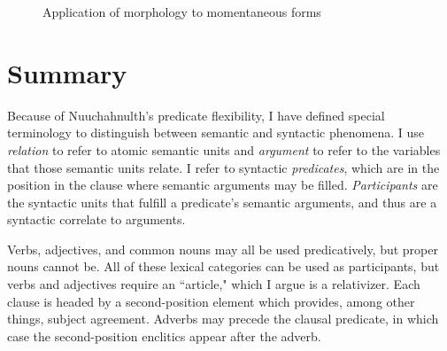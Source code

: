 \begin{figure}[H]
\begin{center}
\caption{Application of morphology to momentaneous forms}
\label{figure:momentaneousapplication}
\end{center}
\end{figure}

\section{Summary} \label{ch:clause:summary}

Because of Nuuchahnulth's predicate flexibility, I have defined special terminology to distinguish between semantic and syntactic phenomena. I use \textit{relation} to refer to atomic semantic units and \textit{argument} to refer to the variables that those semantic units relate. I refer to syntactic \textit{predicates}, which are in the position in the clause where semantic arguments may be filled. \textit{Participants} are the syntactic units that fulfill a predicate's semantic arguments, and thus are a syntactic correlate to arguments.

Verbs, adjectives, and common nouns may all be used predicatively, but proper nouns cannot be. All of these lexical categories can be used as participants, but verbs and adjectives require an ``article," which I argue is a relativizer. Each clause is headed by a second-position element which provides, among other things, subject agreement. Adverbs may precede the clausal predicate, in which case the second-position enclitics appear after the adverb.

